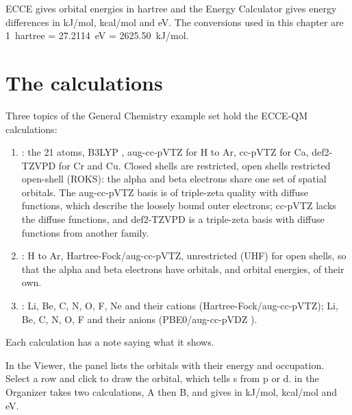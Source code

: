 ECCE gives orbital energies in hartree and the Energy Calculator gives energy differences in kJ/mol, kcal/mol and eV. The conversions used in this chapter are 1~hartree = 27.2114~eV = 2625.50~kJ/mol.

\section{The calculations}
Three topics of the General Chemistry example set hold the ECCE-QM calculations:
\begin{enumerate}
	\item {}: the 21 atoms, B3LYP \cite{becke1993}, aug-cc-pVTZ \cite{kendall1992,woon1993} for H to Ar, cc-pVTZ for Ca, def2-TZVPD \cite{rappoport2010} for Cr and Cu. Closed shells are restricted, open shells restricted open-shell (ROKS): the alpha and beta electrons share one set of spatial orbitals. The aug-cc-pVTZ basis is of triple-zeta quality with diffuse functions, which describe the loosely bound outer electrons; cc-pVTZ lacks the diffuse functions, and def2-TZVPD is a triple-zeta basis with diffuse functions from another family.
	\item {}: H to Ar, Hartree-Fock/aug-cc-pVTZ, unrestricted (UHF) for open shells, so that the alpha and beta electrons have orbitals, and orbital energies, of their own.
	\item {}: Li, Be, C, N, O, F, Ne and their cations (Hartree-Fock/aug-cc-pVTZ); Li, Be, C, N, O, F and their anions (PBE0/aug-cc-pVDZ \cite{adamo1999}).
\end{enumerate}
Each calculation has a note saying what it shows.

In the Viewer, the  panel lists the orbitals with their energy and occupation. Select a row and click  to draw the orbital, which tells s from p or d.  in the Organizer takes two calculations, A then B, and gives  in kJ/mol, kcal/mol and eV.

